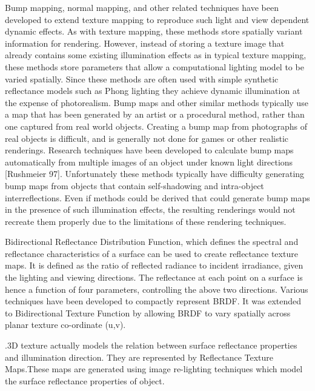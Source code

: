 Bump mapping, normal mapping, and other related techniques have been developed to extend texture mapping to
reproduce such light and view dependent dynamic effects. As with texture mapping, these methods store spatially
variant information for rendering. However, instead of storing a texture image that already contains some existing
illumination effects as in typical texture mapping, these methods store parameters that allow a computational 
lighting model to be varied spatially. Since these methods are often used with simple synthetic reflectance models
such as Phong lighting they achieve dynamic illumination at the expense of photorealism.
Bump maps and other similar methods typically use a map that has been generated by an artist or a procedural
method, rather than one captured from real world objects. Creating a bump map from photographs of real objects
is difficult, and is generally not done for games or other realistic renderings. Research techniques have been
developed to calculate bump maps automatically from multiple images of an object under known light directions 
[Rushmeier 97]. Unfortunately these methods typically have difficulty generating bump maps from objects that 
contain self-shadowing and intra-object interreflections. Even if methods could be derived that could generate
bump maps in the presence of such illumination effects, the resulting renderings would not recreate them properly
due to the limitations of these rendering techniques.

Bidirectional Reflectance Distribution Function, which defines the
spectral and reflectance characteristics of a surface can be used to create
reflectance texture maps. It is defined as the ratio of reflected radiance to
incident irradiance, given the lighting and viewing directions. The reflectance
at each point on a surface is hence a function of four parameters, controlling
the above two directions. Various techniques have been developed to compactly
represent BRDF. It was extended to Bidirectional
Texture Function by allowing BRDF to vary spatially across planar
texture co-ordinate (u,v).

.3D texture actually models the relation
between surface reflectance properties and illumination direction. They are represented
by Reflectance Texture Maps.These maps are generated using image re-lighting techniques
which model the surface reflectance properties of object.


